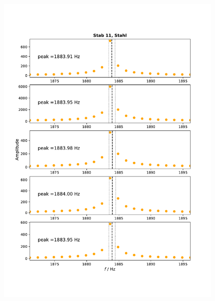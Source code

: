 \documentclass[a4paper, 12pt]{scrartcl}
\begin{document}
\begin{figure}[H]
	\centering
	\includegraphics[width=\linewidth]{plots/anhang4.pdf}
\end{figure}


\end{document}
